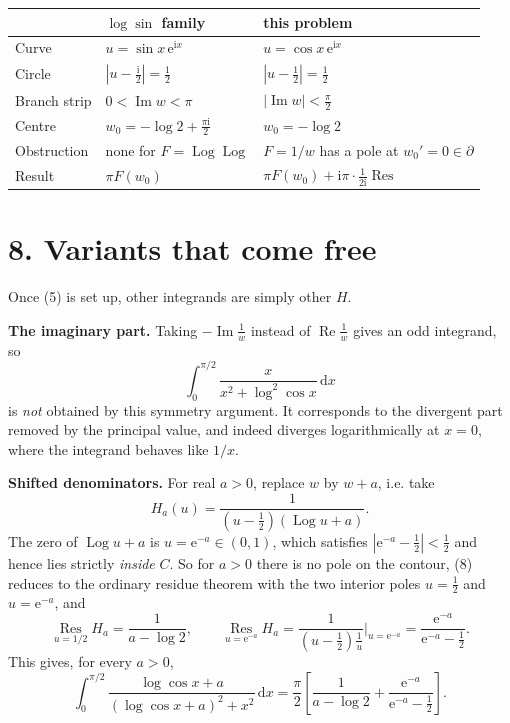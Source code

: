 \documentclass[12pt]{article}
\newcommand{\dd}{\,\mathrm{d}}
\newcommand{\ii}{\mathrm{i}}
\newcommand{\e}{\mathrm{e}}
\newcommand{\Log}{\operatorname{Log}}
\newcommand{\res}{\operatorname*{Res}}
\newcommand{\Rp}{\operatorname{Re}}
\newcommand{\Ip}{\operatorname{Im}}
\begin{document}
\begin{center}
\small
\renewcommand{\arraystretch}{1.4}
\begin{tabularx}{0.94\textwidth}{@{}>{\raggedright\arraybackslash}p{}XX@{}}
\toprule
& \(\log\sin\) family & this problem \\
\midrule
Curve
& \(u=\sin x\,\e^{\ii x}\)
& \(u=\cos x\,\e^{\ii x}\) \\
Circle
& \(\left|u-\frac{\ii}2\right|=\frac12\)
& \(\left|u-\frac12\right|=\frac12\) \\
Branch strip
& \(0<\Ip w<\pi\)
& \(|\Ip w|<\frac\pi2\) \\
Centre
& \(w_0=-\log2+\frac{\pi\ii}{2}\)
& \(w_0=-\log2\) \\
Obstruction
& none for \(F=\Log\Log\)
& \(F=1/w\) has a pole at \(w_0'=0\in\partial\) \\
Result
& \(\pi F(w_0)\)
& \(\pi F(w_0)+\ii\pi\cdot\frac1{2\ii}\res\) \\
\bottomrule
\end{tabularx}
\end{center}

\section*{8. Variants that come free}

Once (5) is set up, other integrands are simply other \(H\).

\textbf{The imaginary part.} Taking \(-\Ip\frac1w\) instead of
\(\Rp\frac1w\) gives an odd integrand, so
\[
\int_0^{\pi/2}\frac{x}{x^2+\log^2\cos x}\dd x
\]
is \emph{not} obtained by this symmetry argument. It corresponds to
the divergent part removed by the principal value, and indeed diverges
logarithmically at \(x=0\), where the integrand behaves like \(1/x\).

\textbf{Shifted denominators.} For real \(a>0\), replace \(w\) by
\(w+a\), i.e. take
\[
H_a(u)=\frac1{\left(u-\frac12\right)(\Log u+a)} .
\]
The zero of \(\Log u+a\) is \(u=\e^{-a}\in(0,1)\), which satisfies
\(\left|\e^{-a}-\frac12\right|<\frac12\) and hence lies strictly
\emph{inside} \(C\). So for \(a>0\) there is no pole on the contour, (8)
reduces to the ordinary residue theorem with the two interior poles
\(u=\frac12\) and \(u=\e^{-a}\), and
\[
\res_{u=1/2}H_a=\frac1{a-\log2},
\qquad
\res_{u=\e^{-a}}H_a
=\frac{1}{\left(u-\frac12\right)\frac1u}\bigg|_{u=\e^{-a}}
=\frac{\e^{-a}}{\e^{-a}-\frac12}.
\]
This gives, for every \(a>0\),
\[
\boxed{\displaystyle
\int_0^{\pi/2}\frac{\log\cos x+a}{(\log\cos x+a)^2+x^2}\dd x
=\frac\pi2\left[\frac1{a-\log2}
+\frac{\e^{-a}}{\e^{-a}-\frac12}\right].}
\tag{9}
\]
\end{document}
